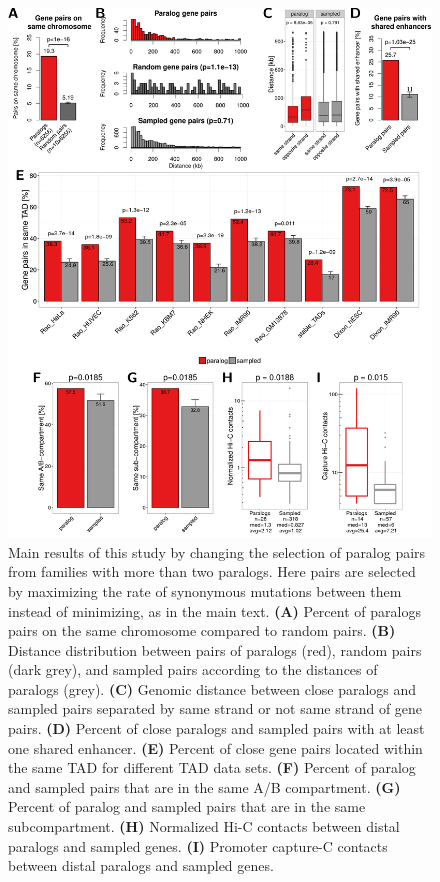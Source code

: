 \documentclass[a4paper,twoside=true,openright,parskip=full,chapterprefix=true,11pt,headings=normal,bibliography=totoc,listof=totoc,titlepage=on,captions=tableabove,draft=false]{scrreprt}
\theoremstyle{definition}
\theoremstyle{definition}
\theoremstyle{definition}
\theoremstyle{remark}
\begin{document}
\begin{figure}

{\centering \includegraphics[width=0.8\linewidth]{figures/paralog/SI/figS2} 

}

\caption{Main results of this study by changing the
selection of paralog pairs from families with more than two paralogs.
Here pairs are selected by maximizing the rate of synonymous mutations
between them instead of minimizing, as in the main text. \textbf{(A)}
Percent of paralogs pairs on the same chromosome compared to random
pairs. \textbf{(B)} Distance distribution between pairs of paralogs
(red), random pairs (dark grey), and sampled pairs according to the
distances of paralogs (grey). \textbf{(C)} Genomic distance between
close paralogs and sampled pairs separated by same strand or not same
strand of gene pairs. \textbf{(D)} Percent of close paralogs and sampled
pairs with at least one shared enhancer. \textbf{(E)} Percent of close
gene pairs located within the same TAD for different TAD data sets.
\textbf{(F)} Percent of paralog and sampled pairs that are in the same
A/B compartment. \textbf{(G)} Percent of paralog and sampled pairs that
are in the same subcompartment. \textbf{(H)} Normalized Hi-C contacts
between distal paralogs and sampled genes. \textbf{(I)} Promoter
capture-C contacts between distal paralogs and sampled genes.}\label{fig:selectOldPairs}
\end{figure}
\end{document}
